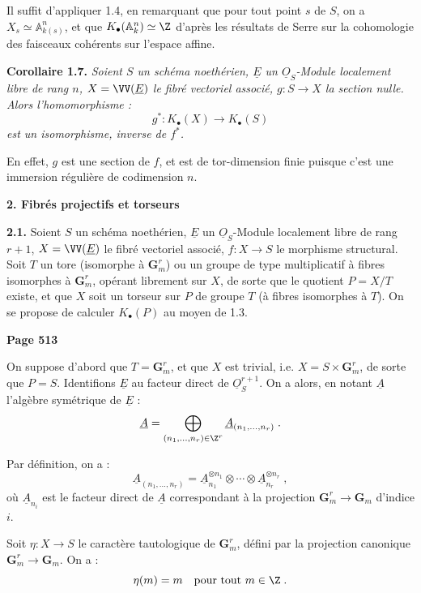 Il suffit d'appliquer 1.4, en remarquant que pour tout point $s$ de $S$, on a $X_s \simeq \mathbb{A}^n_{k(s)}$, et que $K_\bullet(\mathbb{A}^n_k) \simeq \Z$ d'apr\`es les r\'esultats de Serre sur la cohomologie des faisceaux coh\'erents sur l'espace affine.

\medskip
\noindent\textbf{Corollaire 1.7.} \textit{Soient $S$ un sch\'ema noeth\'erien, $\underline{E}$ un $\underline{O}_S$-Module localement libre de rang $n$, $X = \VV(\underline{E})$ le fibr\'e vectoriel associ\'e, $g : S \longrightarrow X$ la section nulle. Alors l'homomorphisme :
\[
g^* : K_\bullet(X) \longrightarrow K_\bullet(S)
\]
est un isomorphisme, inverse de $f^*$.}

En effet, $g$ est une section de $f$, et est de tor-dimension finie puisque c'est une immersion r\'eguli\`ere de codimension $n$.

\medskip
\noindent\textbf{2. Fibr\'es projectifs et torseurs}

\smallskip
\noindent\textbf{2.1.} Soient $S$ un sch\'ema noeth\'erien, $\underline{E}$ un $\underline{O}_S$-Module localement libre de rang $r+1$, $X = \VV(\underline{E})$ le fibr\'e vectoriel associ\'e, $f : X \longrightarrow S$ le morphisme structural. Soit $T$ un tore (isomorphe \`a $\mathbf{G}_m^r$) ou un groupe de type multiplicatif \`a fibres isomorphes \`a $\mathbf{G}_m^r$, op\'erant librement sur $X$, de sorte que le quotient $P = X/T$ existe, et que $X$ soit un torseur sur $P$ de groupe $T$ (\`a fibres isomorphes \`a $T$). On se propose de calculer $K_\bullet(P)$ au moyen de 1.3.

\newpage
\noindent\textbf{Page 513}

On suppose d'abord que $T = \mathbf{G}_m^r$, et que $X$ est trivial, i.e. $X = S \times \mathbf{G}_m^r$, de sorte que $P = S$. Identifions $\underline{E}$ au facteur direct de $\underline{O}_S^{r+1}$. On a alors, en notant $\underline{A}$ l'alg\`ebre sym\'etrique de $\underline{E}$ :
\[
\underline{A} = \bigoplus_{(n_1, \ldots, n_r) \in \Z^r} \underline{A}_{(n_1, \ldots, n_r)}\;.
\]

Par d\'efinition, on a :
\[
\underline{A}_{(n_1, \ldots, n_r)} = \underline{A}_{n_1}^{\otimes n_1} \otimes \cdots \otimes \underline{A}_{n_r}^{\otimes n_r}\;,
\]
o\`u $\underline{A}_{n_i}$ est le facteur direct de $\underline{A}$ correspondant \`a la projection $\mathbf{G}_m^r \longrightarrow \mathbf{G}_m$ d'indice $i$.

Soit $\eta : X \longrightarrow S$ le caract\`ere tautologique de $\mathbf{G}_m^r$, d\'efini par la projection canonique $\mathbf{G}_m^r \longrightarrow \mathbf{G}_m$. On a :
\[
\eta(m) = m \quad \text{pour tout } m \in \Z\;.
\]

